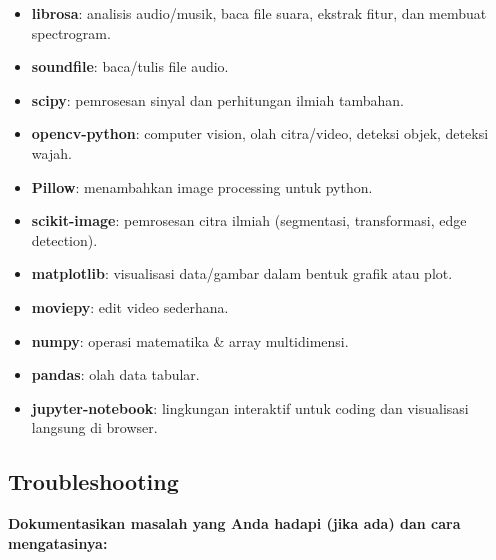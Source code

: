 \documentclass[11pt,a4paper]{article}
\begin{document}
\begin{enumerate}
    \begin{itemize}
        \item \textbf{librosa}: analisis audio/musik, baca file suara, ekstrak fitur, dan membuat spectrogram.
        \item \textbf{soundfile}: baca/tulis file audio.
        \item \textbf{scipy}: pemrosesan sinyal dan perhitungan ilmiah tambahan.
        \item \textbf{opencv-python}: computer vision, olah citra/video, deteksi objek, deteksi wajah.
        \item \textbf{Pillow}: menambahkan image processing untuk python.
        \item \textbf{scikit-image}: pemrosesan citra ilmiah (segmentasi, transformasi, edge detection).
        \item \textbf{matplotlib}: visualisasi data/gambar dalam bentuk grafik atau plot.
        \item \textbf{moviepy}: edit video sederhana.
        \item \textbf{numpy}: operasi matematika \& array multidimensi.
        \item \textbf{pandas}: olah data tabular.
        \item \textbf{jupyter-notebook}: lingkungan interaktif untuk coding dan visualisasi langsung di browser.
    \end{itemize}
\end{enumerate}

\subsection{Troubleshooting}
\textbf{Dokumentasikan masalah yang Anda hadapi (jika ada) dan cara mengatasinya:}
\end{document}
